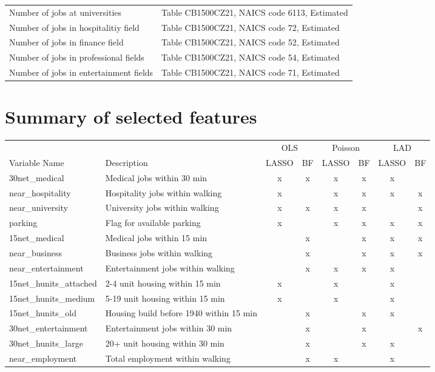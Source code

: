 \documentclass[11pt]{article}
\begin{document}
\begin{appendices}
\begin{tabular}{ll}
Number of jobs at universities&Table CB1500CZ21, NAICS code 6113, Estimated\\
Number of jobs in hospitalitiy field&Table CB1500CZ21, NAICS code 72, Estimated\\
Number of jobs in finance field&Table CB1500CZ21, NAICS code 52, Estimated\\
Number of jobs in professional fields&Table CB1500CZ21, NAICS code 54, Estimated\\
Number of jobs in entertainment fields&Table CB1500CZ21, NAICS code 71, Estimated\\
\end{tabular}
\endgroup



\pagebreak
\section{Summary of selected features}\label{app:featuresum}
\hspace*{-0.4cm}
\begingroup\fontsize{9}{10}\selectfont
\begin{tabular}{llcccccc}
\toprule
&&\multicolumn{2}{c}{OLS}&\multicolumn{2}{c}{Poisson}&\multicolumn{2}{c}{LAD}\\
Variable Name&Description&LASSO&BF&LASSO&BF&LASSO&BF\\
\midrule
30net\_medical&Medical jobs within 30 min&x&x&x&x&x&\\
near\_hospitality&Hospitality jobs within walking&x&&x&x&x&x\\
near\_university&University jobs within walking&x&x&x&x&&x\\
parking&Flag for available parking&x&&x&x&x&x\\
15net\_medical&Medical jobs within 15 min&&x&&x&x&x\\
near\_business&Business jobs within walking&&x&&x&x&x\\
near\_entertainment&Entertainment jobs within walking&&x&x&x&x&\\
15net\_hunits\_attached&2-4 unit housing within 15 min&x&&x&&x&\\
15net\_hunits\_medium&5-19 unit housing within 15 min&x&&x&&x&\\
15net\_hunits\_old&Housing build before 1940 within 15 min&&x&&x&x&\\
30net\_entertainment&Entertainment jobs within 30 min&&x&&x&&x\\
30net\_hunits\_large&20+ unit housing within 30 min&&x&&x&x&\\
near\_employment&Total employment within walking&&x&x&&x&\\

\end{tabular}
\end{appendices}
\end{document}

